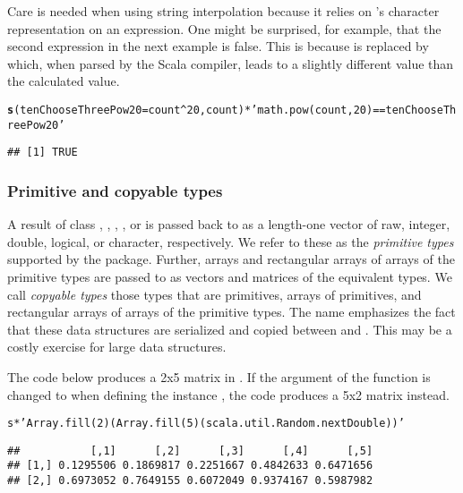 \documentclass[article]{jss}\usepackage[]{graphicx}\usepackage[]{color}
\makeatletter
\newcommand{\hlnum}[1]{\textcolor[rgb]{0.686,0.059,0.569}{#1}}%
\newcommand{\hlstr}[1]{\textcolor[rgb]{0.192,0.494,0.8}{#1}}%
\newcommand{\hlopt}[1]{\textcolor[rgb]{0,0,0}{#1}}%
\newcommand{\hlstd}[1]{\textcolor[rgb]{0.345,0.345,0.345}{#1}}%
\newcommand{\hlkwc}[1]{\textcolor[rgb]{0.333,0.667,0.333}{#1}}%
\newcommand{\hlkwd}[1]{\textcolor[rgb]{0.737,0.353,0.396}{\textbf{#1}}}%
\newenvironment{kframe}{%
 \def\at@end@of@kframe{}%
 \ifinner\ifhmode%
  \def\at@end@of@kframe{\end{minipage}}%
  \begin{minipage}{\columnwidth}%
 \fi\fi%
 \def\FrameCommand##1{\hskip\@totalleftmargin \hskip-\fboxsep
 \colorbox{shadecolor}{##1}\hskip-\fboxsep
     \hskip-\linewidth \hskip-\@totalleftmargin \hskip\columnwidth}%
 \MakeFramed {\advance\hsize-\width
   \@totalleftmargin\z@ \linewidth\hsize
   \@setminipage}}%
 {\par\unskip\endMakeFramed%
 \at@end@of@kframe}
\newenvironment{knitrout}{}{} %
\newcommand{\rscala}{\pkg{rscala}\xspace}
\newcommand{\R}{\proglang{R}\xspace}
\newcommand{\Scala}{\proglang{Scala}\xspace}
\makeatother
\begin{document}
Care is needed when using string interpolation because it relies on \R's
character representation on an \R expression.  One might be surprised, for
example, that the second expression in the next example is false. This is
because  is replaced by 
which, when parsed by the Scala compiler, leads to a slightly different value
than the calculated value.

\begin{knitrout}\small
{}\color{fgcolor}\begin{kframe}
\begin{alltt}
\hlkwd{s}\hlstd{(}\hlkwc{tenChooseThreePow20}\hlstd{=count}\hlopt{^}\hlnum{20}\hlstd{,count)} \hlopt{*} \hlstr{'math.pow(count, 20) == tenChooseThreePow20'}
\end{alltt}
\begin{verbatim}
## [1] TRUE
\end{verbatim}
\end{kframe}
\end{knitrout}

\subsubsection{Primitive and copyable types}

A \Scala result of class , , ,
, or  is passed back to \R as a length-one vector of
raw, integer, double, logical, or character, respectively.  We refer to these
as the \emph{primitive types} supported by the \rscala package. Further, \Scala
arrays and rectangular arrays of arrays of the primitive types are passed to \R
as vectors and matrices of the equivalent \R types.  We call \emph{copyable
types} those types that are primitives, arrays of primitives, and rectangular
arrays of arrays of the primitive types.  The name emphasizes the fact that
these data structures are serialized and copied between \Scala and \R. This may
be a costly exercise for large data structures.

The code below produces a 2x5 matrix in \R.  If the  argument
of the  function is changed to  when defining the
\Scala instance , the code produces a 5x2 matrix instead.

\begin{knitrout}\small
{}\color{fgcolor}\begin{kframe}
\begin{alltt}
\hlstd{s} \hlopt{*} \hlstr{'Array.fill(2)(Array.fill(5)(scala.util.Random.nextDouble))'}
\end{alltt}
\begin{verbatim}
##           [,1]      [,2]      [,3]      [,4]      [,5]
## [1,] 0.1295506 0.1869817 0.2251667 0.4842633 0.6471656
## [2,] 0.6973052 0.7649155 0.6072049 0.9374167 0.5987982
\end{verbatim}
\end{kframe}
\end{knitrout}
\end{document}
